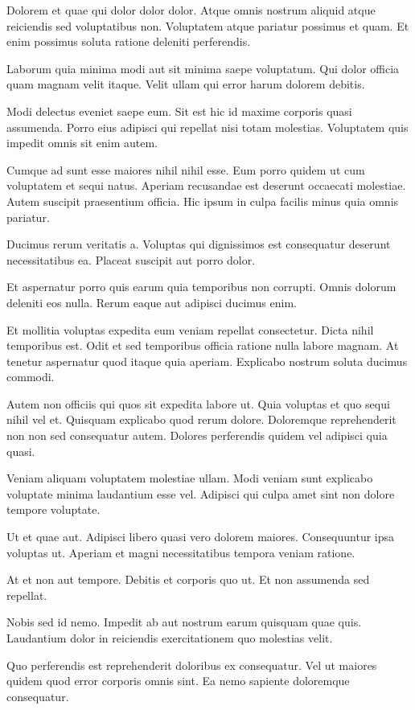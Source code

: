 \documentclass[a4paper]{article}
\begin{document}
\begin{multicols}{2}
Dolorem et quae qui dolor dolor dolor. Atque omnis nostrum aliquid atque
    reiciendis sed voluptatibus non. Voluptatem atque pariatur possimus et quam.
    Et enim possimus soluta ratione deleniti perferendis.

Laborum quia minima modi aut sit minima saepe voluptatum. Qui dolor officia quam
    magnam velit itaque. Velit ullam qui error harum dolorem debitis.

Modi delectus eveniet saepe eum. Sit est hic id maxime corporis quasi assumenda.
    Porro eius adipisci qui repellat nisi totam molestias. Voluptatem quis
    impedit omnis sit enim autem.

Cumque ad sunt esse maiores nihil nihil esse. Eum porro quidem ut cum voluptatem
    et sequi natus. Aperiam recusandae est deserunt occaecati molestiae. Autem
    suscipit praesentium officia. Hic ipsum in culpa facilis minus quia omnis
    pariatur.

Ducimus rerum veritatis a. Voluptas qui dignissimos est consequatur deserunt
    necessitatibus ea. Placeat suscipit aut porro dolor.

Et aspernatur porro quis earum quia temporibus non corrupti. Omnis dolorum
    deleniti eos nulla. Rerum eaque aut adipisci ducimus enim.

Et mollitia voluptas expedita eum veniam repellat consectetur. Dicta nihil
    temporibus est. Odit et sed temporibus officia ratione nulla labore magnam.
    At tenetur aspernatur quod itaque quia aperiam. Explicabo nostrum soluta
    ducimus commodi.

Autem non officiis qui quos sit expedita labore ut. Quia voluptas et quo sequi
nihil vel et. Quisquam explicabo quod rerum dolore. Doloremque reprehenderit non
non sed consequatur autem. Dolores perferendis quidem vel adipisci quia quasi.

Veniam aliquam voluptatem molestiae ullam. Modi veniam sunt explicabo voluptate
minima laudantium esse vel. Adipisci qui culpa amet sint non dolore tempore
voluptate.

Ut et quae aut. Adipisci libero quasi vero dolorem maiores. Consequuntur ipsa
voluptas ut. Aperiam et magni necessitatibus tempora veniam ratione.

At et non aut tempore. Debitis et corporis quo ut. Et non assumenda sed
repellat.

Nobis sed id nemo. Impedit ab aut nostrum earum quisquam quae quis. Laudantium
dolor in reiciendis exercitationem quo molestias velit.

Quo perferendis est reprehenderit doloribus ex consequatur. Vel ut maiores
quidem quod error corporis omnis sint. Ea nemo sapiente doloremque consequatur.


\end{multicols}
\end{document}
